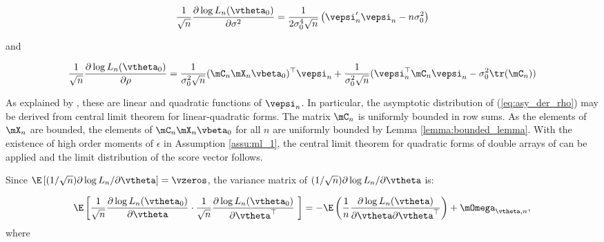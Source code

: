 \documentclass[english,12pt]{book}\usepackage[]{graphicx}\usepackage[]{xcolor}
\begin{document}
\begin{equation}
\frac{1}{\sqrt{n}}\frac{\partial \log L_n(\vtheta_0)}{\partial \sigma^2} = \frac{1}{2\sigma_0^4\sqrt{n}}\left(\vepsi_n'\vepsi_n - n\sigma_0^2\right)
\end{equation}

and

\begin{equation}\label{eq:asy_der_rho}
	\frac{1}{\sqrt{n}}\frac{\partial \log L_n(\vtheta_0)}{\partial \rho} = \frac{1}{\sigma_0^2\sqrt{n}}(\mC_n\mX_n\vbeta_0)^\top \vepsi_n + \frac{1}{\sigma_0^2\sqrt{n}}(\vepsi_n^\top\mC_n\vepsi_n - \sigma_0^2\tr(\mC_n))
\end{equation}

As explained by \citet[][pag. 1905]{lee2004asymptotic}, these are linear and quadratic functions of $\vepsi_n$. In particular, the asymptotic distribution of (\ref{eq:asy_der_rho}) may be derived from central limit theorem for linear-quadratic forms. The matrix $\mC_n$ is uniformly bounded in row sums. As the elements of $\mX_n$ are bounded, the elements of $\mC_n\mX_n\vbeta_0$ for all $n$ are uniformly bounded by Lemma \ref{lemma:bounded_lemma}. With the existence of high order moments of $\epsilon$ in Assumption \ref{assu:ml_1}, the central limit theorem for quadratic forms of double arrays of \cite{kelejian2001asymptotic} can be applied and the limit distribution of the score vector follows.





Since $\E\left[(1 / \sqrt{n}) \partial \log L_n /\partial \vtheta\right]  = \vzeros$,  the variance matrix of $(1 / \sqrt{n}) \partial \log L_n /\partial \vtheta$ is:

\begin{equation}
  \E\left[\frac{1}{\sqrt{n}}\frac{\partial \log L_n (\vtheta_0)}{\partial \vtheta}\cdot\frac{1}{\sqrt{n}}\frac{\partial \log L_n (\vtheta_0)}{\partial \vtheta^\top}\ \right] = - \E\left(\frac{1}{n} \frac{\partial \log L_n(\vtheta)}{\partial \vtheta \partial \vtheta^\top}\right) + \mOmega_{\vtheta, n},
\end{equation}
%
where 
\end{document}
